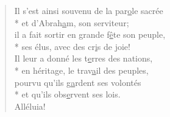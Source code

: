 \begin{verse}
Il s’est ainsi souvenu de la par\underline{o}le sacrée \\*
et d’Abrah\underline{a}m, son serviteur; \\
il a fait sortir en grande f\underline{ê}te son peuple, \\*
ses élus, avec des cr\underline{i}s de joie! \\

Il leur a donné les t\underline{e}rres des nations, \\*
en héritage, le trav\underline{a}il des peuples, \\
pourvu qu’ils g\underline{a}rdent ses volontés \\*
et qu’ils obs\underline{e}rvent ses lois. \\

Alléluia! \\
\end{verse}

